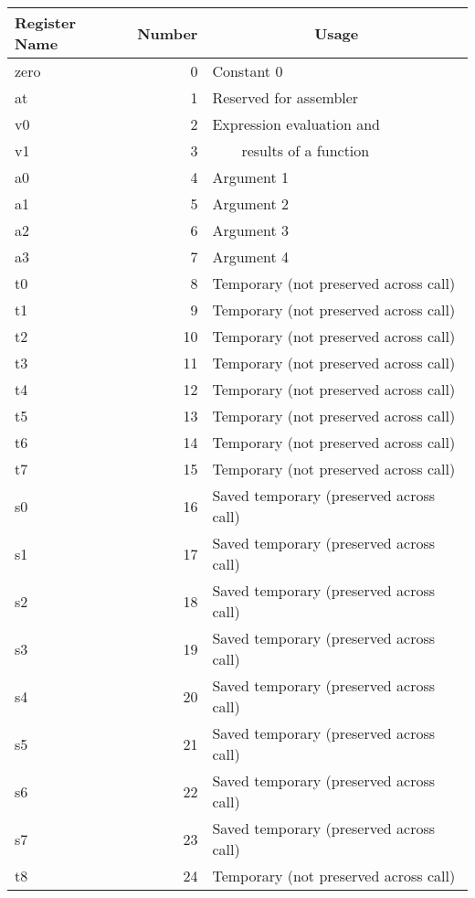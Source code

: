 \documentclass[11pt]{article}
\begin{document}
\begin{table}
  \small
  \begin{center}
  \begin{tabular}{|l|r|l|}
    \hline
     {\bf Register Name} & {\bf Number} & \multicolumn{1}{|c|}{\bf Usage} \\
     \hline
     \hline
      zero & 0 & Constant 0 \\
      at & 1 & Reserved for assembler \\
      v0 & 2 & Expression evaluation and \\
      v1 & 3 & \ \ \ \ results of a function \\
      a0 & 4 & Argument 1 \\
      a1 & 5 & Argument 2 \\
      a2 & 6 & Argument 3 \\
      a3 & 7 & Argument 4 \\
      t0 & 8 & Temporary (not preserved across call) \\
      t1 & 9 & Temporary (not preserved across call) \\
      t2 & 10 & Temporary (not preserved across call) \\
      t3 & 11 & Temporary (not preserved across call) \\
      t4 & 12 & Temporary (not preserved across call) \\
      t5 & 13 & Temporary (not preserved across call) \\
      t6 & 14 & Temporary (not preserved across call) \\
      t7 & 15 & Temporary (not preserved across call) \\
      s0 & 16 & Saved temporary (preserved across call) \\
      s1 & 17 & Saved temporary (preserved across call) \\
      s2 & 18 & Saved temporary (preserved across call) \\
      s3 & 19 & Saved temporary (preserved across call) \\
      s4 & 20 & Saved temporary (preserved across call) \\
      s5 & 21 & Saved temporary (preserved across call) \\
      s6 & 22 & Saved temporary (preserved across call) \\
      s7 & 23 & Saved temporary (preserved across call) \\
      t8 & 24 & Temporary (not preserved across call) \\

\end{tabular}
\end{center}
\end{table}
\end{document}
